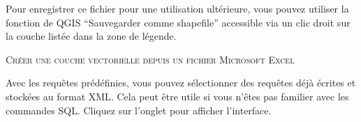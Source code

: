 Pour enregistrer ce fichier pour une utilisation ultérieure, vous pouvez utiliser la fonction de QGIS ``Sauvegarder comme shapefile'' accessible via un clic droit sur la couche listée dans la zone de légende.


\begin{Tip}\caption{\textsc{Créer une couche vectorielle depuis un fichier Microsoft Excel}}
\end{Tip}

\label{evis_predefined}


Avec les requêtes prédéfinies, vous pouvez sélectionner des requêtes déjà écrites et stockées au format XML. Cela peut être utile si vous n'êtes pas familier avec les commandes SQL. Cliquez sur l'onglet  pour afficher l'interface.


